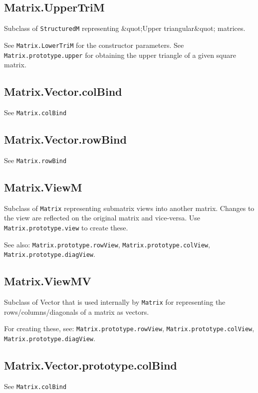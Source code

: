 \documentclass{article}
\begin{document}
    \subsection*{Matrix.UpperTriM}
    Subclass of \texttt{StructuredM} representing \&quot;Upper triangular\&quot; matrices.


See \texttt{Matrix.LowerTriM} for the constructor parameters. See \texttt{Matrix.prototype.upper} for
obtaining the upper triangle of a given square matrix.


    \subsection*{Matrix.Vector.colBind}
    See \texttt{Matrix.colBind}


    \subsection*{Matrix.Vector.rowBind}
    See \texttt{Matrix.rowBind}


    \subsection*{Matrix.ViewM}
    Subclass of \texttt{Matrix} representing submatrix views into another matrix. Changes
to the view are reflected on the original matrix and vice-versa. Use
\texttt{Matrix.prototype.view} to create these.


See also: \texttt{Matrix.prototype.rowView}, \texttt{Matrix.prototype.colView},
\texttt{Matrix.prototype.diagView}.


    \subsection*{Matrix.ViewMV}
    Subclass of Vector that is used internally by \texttt{Matrix} for representing
the rows/columns/diagonals of a matrix as vectors.


For creating these, see: \texttt{Matrix.prototype.rowView}, \texttt{Matrix.prototype.colView},
\texttt{Matrix.prototype.diagView}.


    \subsection*{Matrix.Vector.prototype.colBind}
    See \texttt{Matrix.colBind}
\end{document}

